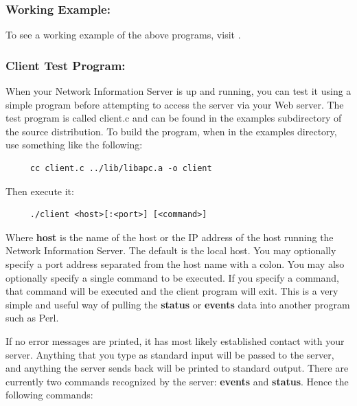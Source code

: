{{{{{{{\label{Working-Example}

\subsubsection*{Working Example:}

\label{index-CGI_002c-working-example-134}
\label{index-Example_002c-CGI-135}
To see a working example of the above programs, visit 
. 

\label{Client-Test-Program}

\subsubsection*{Client Test Program:}

\label{index-Client-Test-program-136}
When your Network Information Server is up and running, you can test it using
a simple program before attempting to access the server via your Web server.
The test program is called client.c and can be found in the examples
subdirectory of the source distribution. To build the program, when in the
examples directory, use something like the following: 

\footnotesize
\begin{verbatim}
     cc client.c ../lib/libapc.a -o client
\end{verbatim}
\normalsize

Then execute it: 

\footnotesize
\begin{verbatim}
     ./client <host>[:<port>] [<command>]
\end{verbatim}
\normalsize

Where {\bf host} is the name of the host or the IP address of the host running
the Network Information Server. The default is the local host. You may
optionally specify a port address separated from the host name with a colon.
You may also optionally specify a single command to be executed. If you
specify a command, that command will be executed and the client program will
exit. This is a very simple and useful way of pulling the {\bf status} or {\bf
events} data into another program such as Perl.  

If no error messages are printed, it has most likely established contact with
your server. Anything that you type as standard input will be passed to the
server, and anything the server sends back will be printed to standard output.
There are currently two commands recognized by the server: {\bf events} and
{\bf status}.  Hence the following commands: 

}}}}}}}
